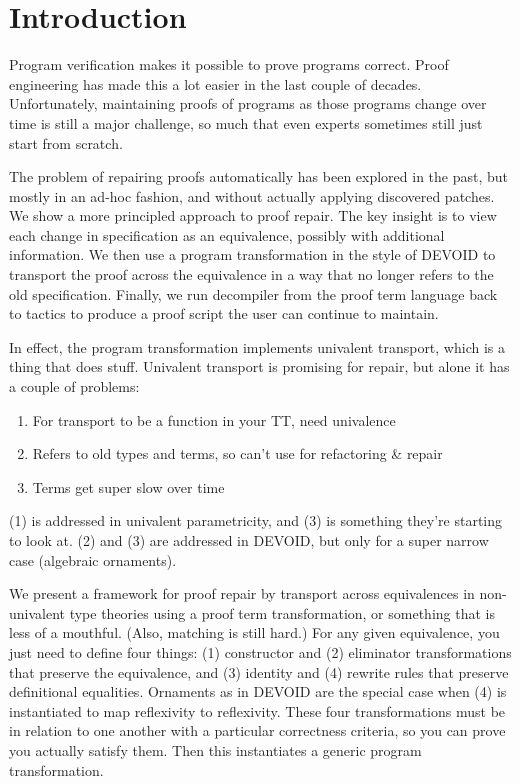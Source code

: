 \section{Introduction}

Program verification makes it possible to prove programs correct.
Proof engineering has made this a lot easier in the last couple of decades.
Unfortunately, maintaining proofs of programs as those programs change over
time is still a major challenge,
so much that even experts sometimes still just start from scratch.

The problem of repairing proofs automatically has been explored in the past,
but mostly in an ad-hoc fashion, and without actually applying discovered patches.
We show a more principled approach to proof repair.
The key insight is to view each change in specification as an equivalence, possibly with additional information.
We then use a program transformation in the style of DEVOID to transport the proof across the equivalence in a way that no longer refers to the
old specification. Finally, we run decompiler from the proof term language back to tactics
to produce a proof script the user can continue to maintain.

In effect, the program transformation implements univalent transport, which is a thing that does stuff.
Univalent transport is promising for repair, but alone it has a couple of problems:

\begin{enumerate}
  \item For transport to be a function in your TT, need univalence
  \item Refers to old types and terms, so can't use for refactoring \& repair
  \item Terms get super slow over time
\end{enumerate}
(1) is addressed in univalent parametricity, and (3) is something they're starting to look at. (2) and (3) are addressed in DEVOID,
but only for a super narrow case (algebraic ornaments).

We present a framework for proof repair by transport across equivalences in non-univalent type theories using a proof term transformation,
or something that is less of a mouthful. (Also, matching is still hard.)
For any given equivalence, you just need to define four things: (1) constructor and (2) eliminator transformations that preserve the equivalence, and (3) identity and (4) rewrite rules that preserve definitional equalities.
Ornaments as in DEVOID are the special case when (4) is instantiated to map reflexivity to reflexivity.
These four transformations must be in relation to one another with a particular correctness criteria, so you can
prove you actually satisfy them. Then this instantiates a generic program transformation.


